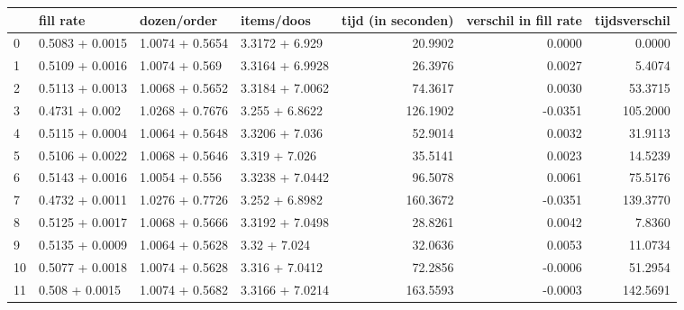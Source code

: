 \begin{tabular}{llllrrr}
\toprule
{} &        fill rate &      dozen/order &       items/doos &  tijd (in seconden) &  verschil in fill rate &  tijdsverschil \\
\midrule
0  &  0.5083 + 0.0015 &  1.0074 + 0.5654 &   3.3172 + 6.929 &             20.9902 &                 0.0000 &         0.0000 \\
1  &  0.5109 + 0.0016 &   1.0074 + 0.569 &  3.3164 + 6.9928 &             26.3976 &                 0.0027 &         5.4074 \\
2  &  0.5113 + 0.0013 &  1.0068 + 0.5652 &  3.3184 + 7.0062 &             74.3617 &                 0.0030 &        53.3715 \\
3  &   0.4731 + 0.002 &  1.0268 + 0.7676 &   3.255 + 6.8622 &            126.1902 &                -0.0351 &       105.2000 \\
4  &  0.5115 + 0.0004 &  1.0064 + 0.5648 &   3.3206 + 7.036 &             52.9014 &                 0.0032 &        31.9113 \\
5  &  0.5106 + 0.0022 &  1.0068 + 0.5646 &    3.319 + 7.026 &             35.5141 &                 0.0023 &        14.5239 \\
6  &  0.5143 + 0.0016 &   1.0054 + 0.556 &  3.3238 + 7.0442 &             96.5078 &                 0.0061 &        75.5176 \\
7  &  0.4732 + 0.0011 &  1.0276 + 0.7726 &   3.252 + 6.8982 &            160.3672 &                -0.0351 &       139.3770 \\
8  &  0.5125 + 0.0017 &  1.0068 + 0.5666 &  3.3192 + 7.0498 &             28.8261 &                 0.0042 &         7.8360 \\
9  &  0.5135 + 0.0009 &  1.0064 + 0.5628 &     3.32 + 7.024 &             32.0636 &                 0.0053 &        11.0734 \\
10 &  0.5077 + 0.0018 &  1.0074 + 0.5628 &   3.316 + 7.0412 &             72.2856 &                -0.0006 &        51.2954 \\
11 &   0.508 + 0.0015 &  1.0074 + 0.5682 &  3.3166 + 7.0214 &            163.5593 &                -0.0003 &       142.5691 \\
\bottomrule
\end{tabular}
